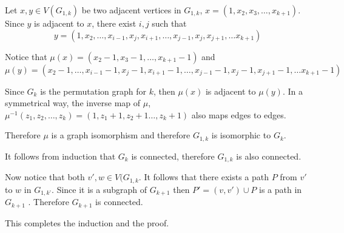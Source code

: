 \begin{enumerate}
        Let $x,y \in V(G_{1,k})$ be two adjacent vertices in $G_{1,k}$, $x = (1,x_2,x_3, \ldots,x_{k+1})$. Since $y$ is adjacent to $x$, there exist $i,j$ such that $$y = (1,x_2, \ldots, x_{i-1}, x_j, x_{i+1}, \ldots, x_{j-1}, x_j, x_{j+1}, \ldots x_{k+1})$$
        
        Notice that $\mu(x) = (x_2-1,x_3-1,\ldots, x_{k+1}-1)$ and $$\mu(y)= (x_2-1, \ldots, x_{i-1}-1, x_j-1, x_{i+1}-1, \ldots, x_{j-1}-1, x_j-1, x_{j+1}-1, \ldots x_{k+1}-1)$$
        
        Since $G_k$ is the permutation graph for $k$, then $\mu(x)$ is adjacent to $\mu(y)$.
        In a symmetrical way, the inverse map of $\mu$, $\mu^{-1}(z_1,z_2, \ldots, z_k) = (1,z_1+1,z_2+1 \ldots, z_k+1)$ also maps edges to edges.
        
        Therefore $\mu$ is a graph isomorphism and therefore $G_{1,k}$ is isomorphic to $G_k$.
        
        It follows from induction that $G_k$ is connected, therefore $G_{1,k}$ is also connected.
        
        Now notice that both $v',w \in V(G_{1,k}$. It follows that there exists a path $P$ from $v'$ to $w$ in $G_{1,k’}$. Since it is a subgraph of $G_{k+1}$ then $P' = (v,v') \cup P$ is a path in $G_{k+1}$ . Therefore $G_{k+1}$ is connected.
        
        This completes the induction and the proof.
        
        
        
        
        
\end{enumerate}

